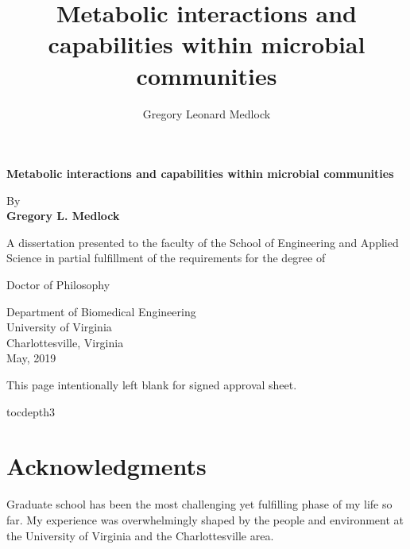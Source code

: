 \documentclass[11pt,twocolumn,notitlepage,openany,twoside]{book}
\title{Metabolic interactions and capabilities within microbial communities}
\author{Gregory Leonard Medlock}
\begin{document}
\frontmatter

\clearpage
\begin{titlepage}
   \begin{center}
       \vspace*{1cm}

       \LARGE
       \textbf{Metabolic interactions and capabilities within microbial communities}


       \vspace{1.5cm}

       \Large
       By\\
       \textbf{Gregory L. Medlock}

       \vspace{2.5cm}

       A dissertation presented to the faculty of the School of Engineering and Applied Science in partial fulfillment of the requirements for the degree of\\

       \vspace{1.5cm}

       Doctor of Philosophy

       \vspace{1.5cm}

       Department of Biomedical Engineering\\
       University of Virginia\\
       Charlottesville, Virginia\\
       May, 2019

   \end{center}
\end{titlepage}

\clearpage
This page intentionally left blank for signed approval sheet.
\clearpage

\begingroup
\let\clearpage


\setcounter{tocdepth}{3}
\tableofcontents
\hspace{1.5cm}
\listoffigures
\hspace{1.5cm}


\endgroup
\clearpage
{}
\section{Acknowledgments}
\thispagestyle{plain}
Graduate school has been the most challenging yet fulfilling phase of my life so far. My experience was overwhelmingly shaped by the people and environment at the University of Virginia and the Charlottesville area.
\end{document}
